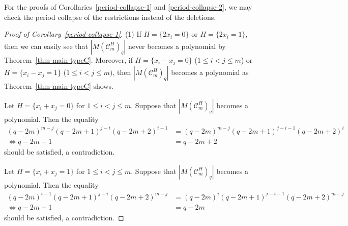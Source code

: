 \documentclass{article}
\theoremstyle{plain}
\theoremstyle{definition}
\theoremstyle{remark}
\numberwithin{equation}{section}
\begin{document}
For the proofs of Corollaries~\ref{period-collapse-1} and \ref{period-collapse-2}, we may check the period collapse of the restrictions instead of the deletions. 
\begin{proof}[Proof of Corollary~\ref{period-collapse-1}]
(1) If $H=\{2x_i=0\}$ or $H=\{2x_i=1\}$, then we can easily see that $|M(\mathcal{C}_m^H)_q|$ never becomes a polynomial by Theorem~\ref{thm-main-typeC}. 
Moreover, if $H=\{x_i-x_j=0\}$ ($1 \leq i < j \leq m$) or $H=\{x_i-x_j=1\}$ ($1 \leq i < j \leq m)$, then $|M(\mathcal{C}_m^H)_q|$ becomes a polynomial as Theorem~\ref{thm-main-typeC} shows. 
%

Let $H=\{x_i+x_j=0\}$ for $1 \leq i < j \leq m$. Suppose that $|M(\mathcal{C}_m^H)_q|$ becomes a polynomial. Then the equality
\begin{align*}
    (q-2m)^{m-j}(q-2m+1)^{j-i}(q-2m+2)^{i-1} &= (q-2m)^{m-j}(q-2m+1)^{j-i-1}(q-2m+2)^{i} \\
    \Longleftrightarrow q-2m+1 &= q-2m+2
\end{align*}
should be satisfied, a contradiction.

Let $H=\{x_i+x_j=1\}$ for $1 \leq i < j \leq m$. Suppose that $|M(\mathcal{C}_m^H)_q|$ becomes a polynomial. Then the equality 
\begin{align*}
    (q-2m)^{i-1}(q-2m+1)^{j-i}(q-2m+2)^{m-j} &= (q-2m)^{i}(q-2m+1)^{j-i-1}(q-2m+2)^{m-j} \\
    \Longleftrightarrow q-2m+1 &= q-2m 
\end{align*}
should be satisfied, a contradiction.


\end{proof}
\end{document}
